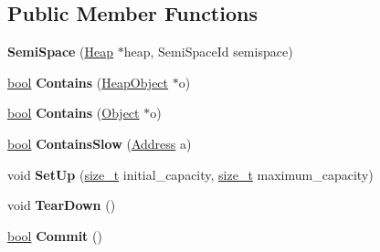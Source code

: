 \subsection*{Public Member Functions}
\begin{DoxyCompactItemize}
\item 
\mbox{\label{classv8_1_1internal_1_1SemiSpace_a1958ffe221d002476c29da54612956f0}} 
{\bfseries Semi\+Space} (\mbox{\hyperlink{classv8_1_1internal_1_1Heap}{Heap}} $\ast$heap, Semi\+Space\+Id semispace)
\item 
\mbox{\label{classv8_1_1internal_1_1SemiSpace_a7b8cab12d3c9941c5d09b181900dd61c}} 
\mbox{\hyperlink{classbool}{bool}} {\bfseries Contains} (\mbox{\hyperlink{classv8_1_1internal_1_1HeapObject}{Heap\+Object}} $\ast$o)
\item 
\mbox{\label{classv8_1_1internal_1_1SemiSpace_a6dc2672844ad19e9ed67d92fd8fa7d52}} 
\mbox{\hyperlink{classbool}{bool}} {\bfseries Contains} (\mbox{\hyperlink{classv8_1_1internal_1_1Object}{Object}} $\ast$o)
\item 
\mbox{\label{classv8_1_1internal_1_1SemiSpace_abbbef2d1954093488b830f774c5bfb76}} 
\mbox{\hyperlink{classbool}{bool}} {\bfseries Contains\+Slow} (\mbox{\hyperlink{classuintptr__t}{Address}} a)
\item 
\mbox{\label{classv8_1_1internal_1_1SemiSpace_aa1ca5030e16e0fa8d2139c2c06297be4}} 
void {\bfseries Set\+Up} (\mbox{\hyperlink{classsize__t}{size\+\_\+t}} initial\+\_\+capacity, \mbox{\hyperlink{classsize__t}{size\+\_\+t}} maximum\+\_\+capacity)
\item 
\mbox{\label{classv8_1_1internal_1_1SemiSpace_a2e5b66ad47c14767b0035ed5006c2152}} 
void {\bfseries Tear\+Down} ()
\item 
\mbox{\label{classv8_1_1internal_1_1SemiSpace_abcde77679b352a13023036322527bdd8}} 
\mbox{\hyperlink{classbool}{bool}} {\bfseries Commit} ()
\item 
\mbox{\label{classv8_1_1internal_1_1SemiSpace_a61e540c5fda1ce8ca1d3eba9ea7b79dc}} 

\end{DoxyCompactItemize}
